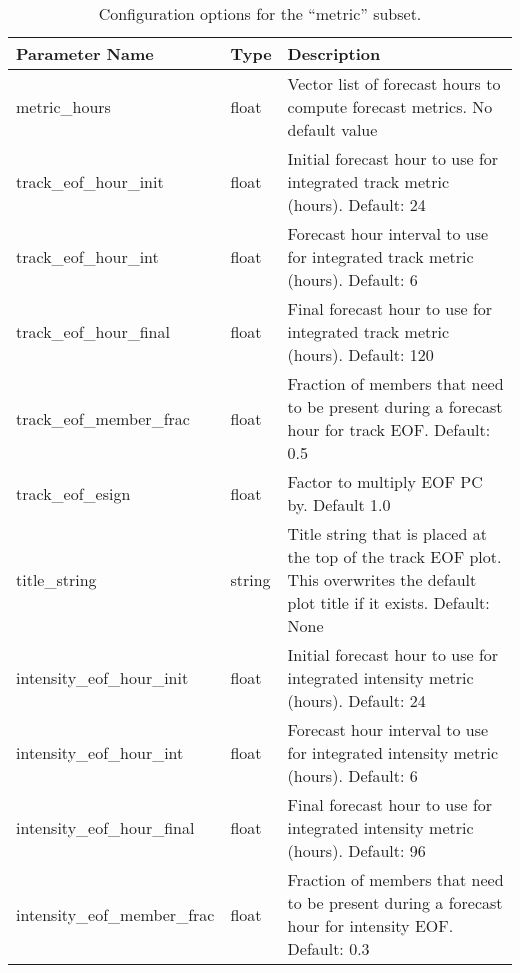 \documentclass[psfig,12pt]{article}
\begin{document}
\begin{table}[H]
\caption{Configuration options for the ``metric'' subset.}
\begin{center}
\begin{tabular}{|p{1.75in}|p{0.5in}|p{4.00in}|}
\hline
Parameter Name & Type & Description \\ \hline \hline

metric\_hours & float & Vector list of forecast hours to compute forecast metrics.  No default value \\ \hline
track\_eof\_hour\_init & float & Initial forecast hour to use for integrated track metric (hours).  Default: 24 \\ \hline

track\_eof\_hour\_int & float & Forecast hour interval to use for integrated track metric (hours).  Default:  6 \\ \hline

track\_eof\_hour\_final & float & Final forecast hour to use for integrated track metric (hours).  Default: 120 \\ \hline

track\_eof\_member\_frac & float & Fraction of members that need to be present during a forecast hour for track EOF.  Default:  0.5 \\ \hline

track\_eof\_esign & float & Factor to multiply EOF PC by.  Default 1.0 \\ \hline

title\_string & string & Title string that is placed at the top of the track EOF plot.  This overwrites the default
plot title if it exists.  Default:  None \\ \hline

intensity\_eof\_hour\_init & float & Initial forecast hour to use for integrated intensity metric (hours).  Default: 24 \\ \hline

intensity\_eof\_hour\_int & float & Forecast hour interval to use for integrated intensity metric (hours).  Default:  6 \\ \hline

intensity\_eof\_hour\_final & float & Final forecast hour to use for integrated intensity metric (hours).  Default: 96 \\ \hline

intensity\_eof\_member\_frac & float & Fraction of members that need to be present during a forecast hour for intensity EOF.  Default:  0.3 \\ \hline


\end{tabular}
\end{center}
\end{table}
\end{document}
